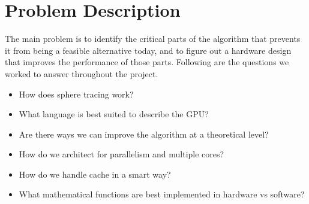 \chapter{Problem Description}

	The main problem is to identify the critical parts of the algorithm that
	prevents it from being a feasible alternative today, and to figure out a
	 hardware design that improves the performance of those parts. Following are the
	questions we worked to answer throughout the project.
	
	\begin{itemize}
		\item How does sphere tracing work?
		\item What language is best suited to describe the GPU?
		\item Are there ways we can improve the algorithm at a theoretical 
			level?
		\item How do we architect for parallelism and multiple cores?
		\item How do we handle cache in a smart way?
		\item What mathematical functions are best implemented in hardware vs 
			software?
	\end{itemize}
